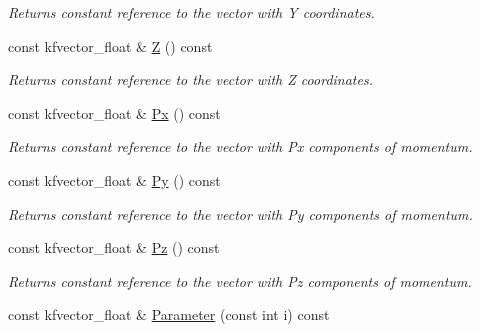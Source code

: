\begin{DoxyCompactItemize}
\begin{DoxyCompactList}\small\item\em Returns constant reference to the vector with Y coordinates. \end{DoxyCompactList}\item 
const kfvector\+\_\+float \& \hyperlink{classKFPTrackVector_af046462b47092ae30b6a71cdf045bc46}{Z} () const \hypertarget{classKFPTrackVector_af046462b47092ae30b6a71cdf045bc46}{}\label{classKFPTrackVector_af046462b47092ae30b6a71cdf045bc46}

\begin{DoxyCompactList}\small\item\em Returns constant reference to the vector with Z coordinates. \end{DoxyCompactList}\item 
const kfvector\+\_\+float \& \hyperlink{classKFPTrackVector_acc62b87f4a8abb3fa90be944b297fdfe}{Px} () const \hypertarget{classKFPTrackVector_acc62b87f4a8abb3fa90be944b297fdfe}{}\label{classKFPTrackVector_acc62b87f4a8abb3fa90be944b297fdfe}

\begin{DoxyCompactList}\small\item\em Returns constant reference to the vector with Px components of momentum. \end{DoxyCompactList}\item 
const kfvector\+\_\+float \& \hyperlink{classKFPTrackVector_a8050fb3c0bf6f72a65ee374edf0900bb}{Py} () const \hypertarget{classKFPTrackVector_a8050fb3c0bf6f72a65ee374edf0900bb}{}\label{classKFPTrackVector_a8050fb3c0bf6f72a65ee374edf0900bb}

\begin{DoxyCompactList}\small\item\em Returns constant reference to the vector with Py components of momentum. \end{DoxyCompactList}\item 
const kfvector\+\_\+float \& \hyperlink{classKFPTrackVector_aec46a56f9fabb8041075ed19cbdbc256}{Pz} () const \hypertarget{classKFPTrackVector_aec46a56f9fabb8041075ed19cbdbc256}{}\label{classKFPTrackVector_aec46a56f9fabb8041075ed19cbdbc256}

\begin{DoxyCompactList}\small\item\em Returns constant reference to the vector with Pz components of momentum. \end{DoxyCompactList}\item 
const kfvector\+\_\+float \& \hyperlink{classKFPTrackVector_ad489c56d0f7d957bc3a9e7726ba69710}{Parameter} (const int i) const \hypertarget{classKFPTrackVector_ad489c56d0f7d957bc3a9e7726ba69710}{}\label{classKFPTrackVector_ad489c56d0f7d957bc3a9e7726ba69710}


\end{DoxyCompactItemize}
